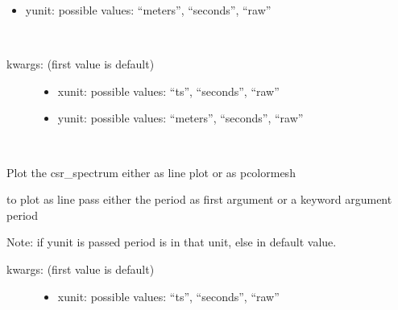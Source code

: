 \documentclass[letterpaper,10pt,openany,oneside,english]{sphinxmanual}
\begin{document}
\begin{fulllineitems}
\begin{fulllineitems}
\begin{description}
\begin{itemize}
\item {} 
yunit: possible values: “meters”, “seconds”, “raw”

\end{itemize}

\end{description}

\end{fulllineitems}


\begin{fulllineitems}
\label{\detokenize{plots:plots.SimplePlotter.bunch_population}}~\begin{description}
\item[{kwargs: (first value is default)  }] \leavevmode\begin{itemize}
\item {} 
xunit: possible values: “ts”, “seconds”, “raw”

\item {} 
yunit: possible values: “meters”, “seconds”, “raw”

\end{itemize}

\end{description}

\end{fulllineitems}


\begin{fulllineitems}
\label{\detokenize{plots:plots.SimplePlotter.csr_spectrum}}~
\begin{DUlineblock}{0em}
\item[] Plot the csr\_spectrum either as line plot or as pcolormesh  
\item[] to plot as line pass either the period as first argument or a keyword argument period  
\item[] Note: if yunit is passed period is in that unit, else in default value.  
\end{DUlineblock}
\begin{description}
\item[{kwargs: (first value is default)  }] \leavevmode\begin{itemize}
\item {} 
xunit: possible values: “ts”, “seconds”, “raw”


\end{itemize}
\end{description}
\end{fulllineitems}
\end{fulllineitems}
\end{document}
